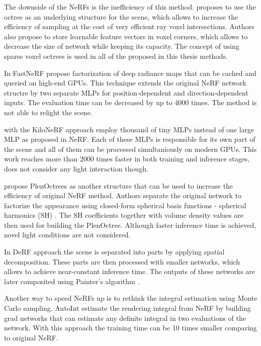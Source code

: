 The downside of the NeRFs is the inefficiency of this method.
\cite{liu2021neural} proposes to use the octree as an underlying structure for the scene,
which allows to increase the efficiency of sampling at the cost of very efficient ray voxel intersections.
Authors also propose to store learnable feature vectors in voxel corners,
which allows to decrease the size of network while keeping its capacity.
The concept of using sparse voxel octrees is used in all of the proposed in this thesis methods.

In FastNeRF \cite{garbin2021fastnerf} propose factorization of deep radiance maps
that can be cached and queried on high-end GPUs.
This technique extends the original NeRF network structre
by two separate MLPs for position-dependent and direction-dependent inputs.
The evaluation time can be decreased by up to 4000 times.
The method is not able to relight the scene.

\cite{reiser2021kilonerf} with the KiloNeRF approach employ thousand of tiny MLPs 
instead of one large MLP as proposed in NeRF.
Each of these MLPs is responsible for its own part of the scene
and all of them can be processed simultaniously on modern GPUs.
This work reaches more than 2000 times faster in both training and inference stages,
does not consider any light interaction though.

\cite{yu2021plenoctrees} propose PlenOctrees as another structure that can be used to increase the efficiency of original NeRF method.
Authors separate the original network to factorize the appearance using closed-form
spherical basis functions - spherical harmonics (SH) \cite{mohlenkamp1997spherical}.
The SH coefficients together with volume density values are then used
for building the PlenOctree.
Although faster inference time is achieved, novel light conditions are not considered.

In DeRF approach \cite{rebain2020derf} the scene is separated into parts by applying spatial decomposition.
These parts are then processed with smaller networks, which allows to achieve near-constant inference time.
The outputs of these networks are later composited using Painter's algorithm \cite{deBerg2008}.

Another way to speed NeRFs up is to rethink the integral estimation using Monte Carlo sampling.
AutoInt \cite{lindell2021autoint} estimate the rendering integral from NeRF
by building grad networks that can estimate any definite integral in two evaluations of the network.
With this approach the training time can be 10 times smaller comparing to original NeRF.

